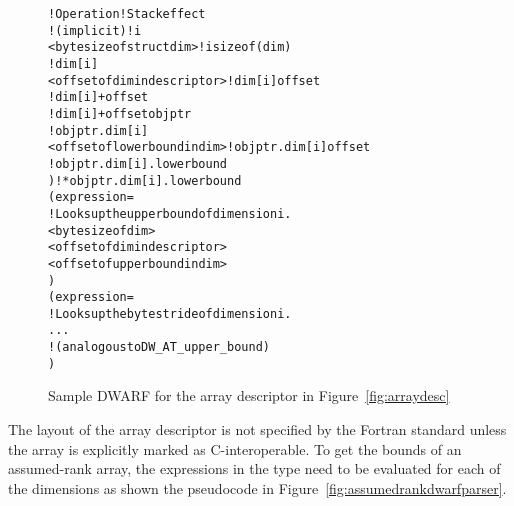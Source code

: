 \begin{figure}[!h]
\begin{minipage}[t]{\linewidth}
\begin{framed}
\begin{alltt}
             !   Operation                              ! Stack effect
             !   (implicit)                             ! i                                                                     
                 <byte size of struct dim>     ! i sizeof(dim)
                                              ! dim[i]
                 <offset of dim in descriptor> ! dim[i] offset
                                              ! dim[i]+offset
                               ! dim[i]+offset objptr
                                              ! objptr.dim[i]
                 <offset of lowerbound in dim> ! objptr.dim[i] offset
                                              ! objptr.dim[i].lowerbound
                 )                           ! *objptr.dim[i].lowerbound
             (expression=
             !   Looks up the upper bound of dimension i.
                 <byte size of dim>
                 <offset of dim in descriptor>
                 <offset of upperbound in dim>
                 )
             (expression=
             !   Looks up the byte stride of dimension i.
                 ...
             !   (analogous to DW\_AT\_upper\_bound)
                 )
\end{alltt}
\end{framed}
\end{minipage}
\caption{Sample DWARF for the array descriptor in Figure~\ref{fig:arraydesc}}
\label{fig:assumedrankdwarf}
\end{figure}

The layout of the array descriptor is not specified by the Fortran
standard unless the array is explicitly marked as C-interoperable. To
get the bounds of an assumed-rank array, the expressions in the
\DWTAGgenericsubrange{} type need to be evaluated for each of the
\DWATrank{} dimensions as shown the pseudocode in
Figure~\ref{fig:assumedrankdwarfparser}.

